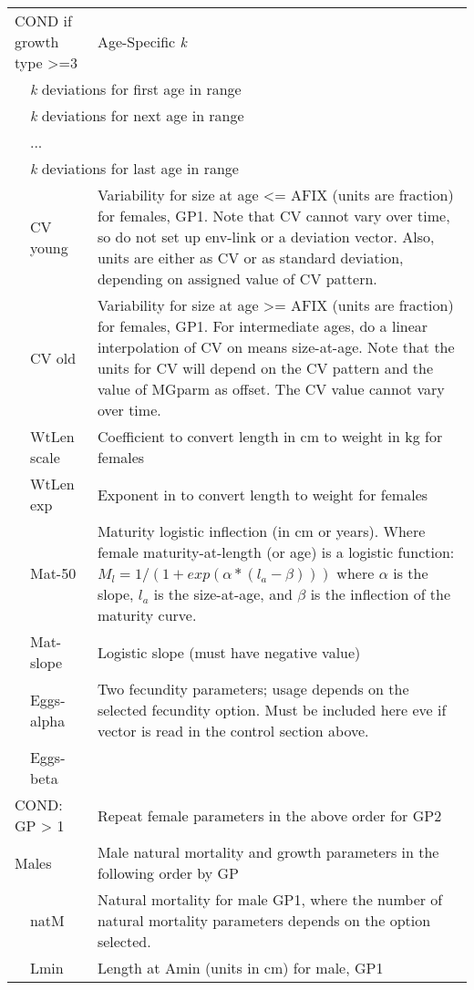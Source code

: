 \begin{center}
\begin{longtable}{p{1cm} p{2.5cm} p{10cm}}
		\multicolumn{2}{l}{COND if growth type >=3 } & Age-Specific \textit{k}\\
		& \multicolumn{2}{l}{\textit{k} deviations for first age in range}\\
		& \multicolumn{2}{l}{\textit{k} deviations for next age in range}\\
		& ... & \\
		& \multicolumn{2}{l}{\textit{k} deviations for last age in range}\\
		\hline
	    & CV young & Variability for size at age <= AFIX (units are fraction) for females, GP1.  Note that CV cannot vary over time, so do not set up env-link or a deviation vector.  Also, units are either as CV or as standard deviation, depending on assigned value of CV pattern.\\
		& CV old & Variability for size at age >= AFIX (units are fraction) for females, GP1. For intermediate ages, do a linear interpolation of CV on means size-at-age.  Note that the units for CV will depend on the CV pattern and the value of MGparm as offset. The CV value cannot vary over time.\\
		\hline
		& WtLen scale & Coefficient to convert length in cm to weight in kg for females\\
		& WtLen exp & Exponent in to convert length to weight for females\\
		& Mat-50 & Maturity logistic inflection (in cm or years).  Where female maturity-at-length (or age) is a logistic function: $M_{l} = 1/(1+exp(\alpha*(l_{a} - \beta)))$ where $\alpha$ is the slope, $l_{a}$ is the size-at-age, and $\beta$ is the inflection of the maturity curve. \\ 
		& Mat-slope & Logistic slope (must have negative value) \\
		& Eggs-alpha & Two fecundity parameters; usage depends on the selected fecundity option.  Must be included here eve if vector is read in the control section above.\\
		& Eggs-beta & \\
		\hline
		\multicolumn{2}{l}{COND: GP > 1} & Repeat female parameters in the above order for GP2\\
		\hline
		\multicolumn{2}{l}{Males} & Male natural mortality and growth parameters in the following order by GP\\
		& natM & Natural mortality for male GP1, where the number of natural mortality parameters depends on the option selected.\\
		& Lmin & Length at Amin (units in cm) for male, GP1\\

\end{longtable}
\end{center}
